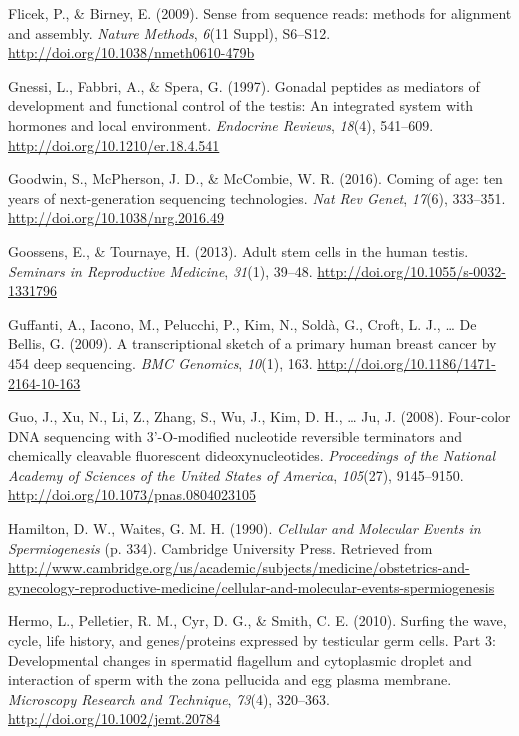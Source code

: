 \documentclass[12pt,twoside]{reedthesis}
\theoremstyle{definition}
\theoremstyle{definition}
\theoremstyle{remark}
\begin{document}
  \hypertarget{ref-Flicek2009}{}
  Flicek, P., \& Birney, E. (2009). Sense from sequence reads: methods for
  alignment and assembly. \emph{Nature Methods}, \emph{6}(11 Suppl),
  S6--S12. \url{http://doi.org/10.1038/nmeth0610-479b}
  
  \hypertarget{ref-Gnessi1997}{}
  Gnessi, L., Fabbri, A., \& Spera, G. (1997). Gonadal peptides as
  mediators of development and functional control of the testis: An
  integrated system with hormones and local environment. \emph{Endocrine
  Reviews}, \emph{18}(4), 541--609.
  \url{http://doi.org/10.1210/er.18.4.541}
  
  \hypertarget{ref-Goodwin2016}{}
  Goodwin, S., McPherson, J. D., \& McCombie, W. R. (2016). Coming of age:
  ten years of next-generation sequencing technologies. \emph{Nat Rev
  Genet}, \emph{17}(6), 333--351. \url{http://doi.org/10.1038/nrg.2016.49}
  
  \hypertarget{ref-Goossens2013}{}
  Goossens, E., \& Tournaye, H. (2013). Adult stem cells in the human
  testis. \emph{Seminars in Reproductive Medicine}, \emph{31}(1), 39--48.
  \url{http://doi.org/10.1055/s-0032-1331796}
  
  \hypertarget{ref-Guffanti2009}{}
  Guffanti, A., Iacono, M., Pelucchi, P., Kim, N., Soldà, G., Croft, L.
  J., \ldots{} De Bellis, G. (2009). A transcriptional sketch of a primary
  human breast cancer by 454 deep sequencing. \emph{BMC Genomics},
  \emph{10}(1), 163. \url{http://doi.org/10.1186/1471-2164-10-163}
  
  \hypertarget{ref-Guo2008}{}
  Guo, J., Xu, N., Li, Z., Zhang, S., Wu, J., Kim, D. H., \ldots{} Ju, J.
  (2008). Four-color DNA sequencing with 3'-O-modified nucleotide
  reversible terminators and chemically cleavable fluorescent
  dideoxynucleotides. \emph{Proceedings of the National Academy of
  Sciences of the United States of America}, \emph{105}(27), 9145--9150.
  \url{http://doi.org/10.1073/pnas.0804023105}
  
  \hypertarget{ref-Hamilton1987}{}
  Hamilton, D. W., Waites, G. M. H. (1990). \emph{Cellular and Molecular
  Events in Spermiogenesis} (p. 334). Cambridge University Press.
  Retrieved from
  \url{http://www.cambridge.org/us/academic/subjects/medicine/obstetrics-and-gynecology-reproductive-medicine/cellular-and-molecular-events-spermiogenesis}
  
  \hypertarget{ref-Hermo2010}{}
  Hermo, L., Pelletier, R. M., Cyr, D. G., \& Smith, C. E. (2010). Surfing
  the wave, cycle, life history, and genes/proteins expressed by
  testicular germ cells. Part 3: Developmental changes in spermatid
  flagellum and cytoplasmic droplet and interaction of sperm with the zona
  pellucida and egg plasma membrane. \emph{Microscopy Research and
  Technique}, \emph{73}(4), 320--363.
  \url{http://doi.org/10.1002/jemt.20784}
  
\end{document}

